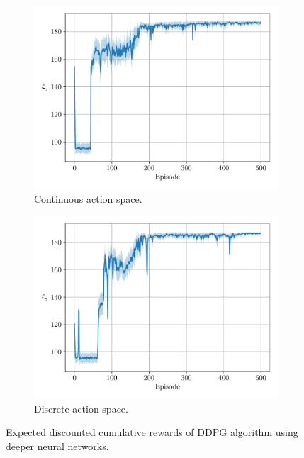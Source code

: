 \documentclass[a4paper, 12pt]{article}
\begin{document}
    \begin{figure}[H]
        \centering
        \begin{subfigure}{0.49\textwidth}
            \centering
            \includegraphics[width=\textwidth]{resources/pdf/ddpg_J_None_8_0.95.pdf}
            \caption{Continuous action space.}
        \end{subfigure}
        \hfill
        \begin{subfigure}{0.49\textwidth}
            \centering
            \includegraphics[width=\textwidth]{resources/pdf/ddpg_J_11_8_0.95.pdf}
            \caption{Discrete action space.}
        \end{subfigure}
        \caption{Expected discounted cumulative rewards of DDPG algorithm using deeper neural networks.}
        \label{fig:ddpg.rewards.deeper}
    \end{figure}
    
\end{document}

